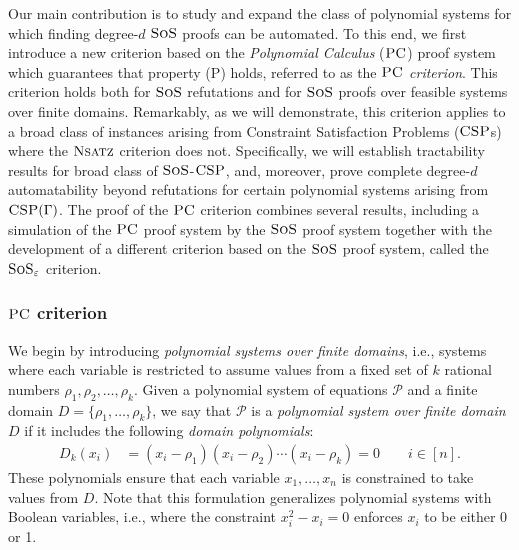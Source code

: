 \documentclass[11pt]{article}
\newcommand{\sos}{\text{\sc{SoS}}}
\newcommand{\CSP}{\textsc{CSP}}
\newcommand{\PC}{\textsc{PC}}
\newcommand{\Nsatz}{\textsc{Nsatz}}
\newcommand{\1}{\textbf{1}}
\begin{document}
Our main contribution is to study and expand the class of polynomial systems for which finding degree-$d$ \(\sos\) proofs can be automated. To this end, we first introduce a new criterion based on the \textit{Polynomial Calculus} ($\PC$) proof system which guarantees that property (\textsc{P}) holds, referred to as the \textit{$\PC$ criterion}. This criterion holds both for $\sos$ refutations and for $\sos$ proofs over feasible systems over finite domains. Remarkably, as we will demonstrate, this criterion applies to a broad class of instances arising from Constraint Satisfaction Problems ($\CSP$s) where the $\Nsatz$ criterion does not. Specifically, we will establish tractability results for broad class of $\sos$-$\CSP$, and, moreover, prove complete degree-$d$ automatability beyond refutations for certain polynomial systems arising from $\CSP(\Gamma)$. The proof of the $\PC$ criterion combines several results, including a simulation of the $\PC$ proof system by the $\sos$  proof system together with the development of a different criterion based on the $\sos$ proof system, called the \(\sos_{\varepsilon}\) criterion.

\subsubsection*{$\PC$ criterion} \label{sect:PC-crit}
We begin by introducing \textit{polynomial systems over finite domains}, i.e., systems where each variable is restricted to assume values from a fixed set of $k$ rational numbers $ \rho_{1}, \rho_{2}, \ldots, \rho_{k} $. Given a polynomial system of equations $\mathcal{P}$ and a finite domain $D = \{\rho_1, \ldots, \rho_{k}\}$, we say that $\mathcal{P}$ is a \emph{polynomial system over finite domain $D$} if it includes the following \textit{domain polynomials}:
\begin{align}
D_{k}(x_i)&=(x_i-\rho_{1})(x_i-\rho_{2})\cdots (x_i-\rho_{k}) = 0\qquad i\in[n].
\end{align}
These polynomials ensure that each variable $x_1, \ldots, x_n$ is constrained to take values from $D$. Note that this formulation generalizes polynomial systems with Boolean variables, i.e., where the constraint \( x_i^2 - x_i = 0 \) enforces $x_i$ to be either 0 or 1.
\end{document}

